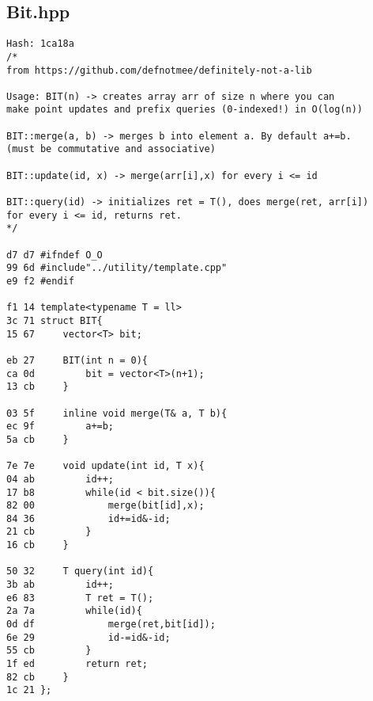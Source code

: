 \documentclass[11pt, a4paper, twoside]{article}
\begin{document}
\subsection{Bit.hpp}
\begin{lstlisting}
Hash: 1ca18a
/*
from https://github.com/defnotmee/definitely-not-a-lib

Usage: BIT(n) -> creates array arr of size n where you can
make point updates and prefix queries (0-indexed!) in O(log(n))

BIT::merge(a, b) -> merges b into element a. By default a+=b.
(must be commutative and associative)

BIT::update(id, x) -> merge(arr[i],x) for every i <= id

BIT::query(id) -> initializes ret = T(), does merge(ret, arr[i])
for every i <= id, returns ret.
*/

d7 d7 #ifndef O_O
99 6d #include"../utility/template.cpp"
e9 f2 #endif

f1 14 template<typename T = ll>
3c 71 struct BIT{
15 67     vector<T> bit;
      
eb 27     BIT(int n = 0){
ca 0d         bit = vector<T>(n+1);
13 cb     }
          
03 5f     inline void merge(T& a, T b){
ec 9f         a+=b;
5a cb     }
      
7e 7e     void update(int id, T x){
04 ab         id++;
17 b8         while(id < bit.size()){
82 00             merge(bit[id],x);
84 36             id+=id&-id;
21 cb         }
16 cb     }
      
50 32     T query(int id){
3b ab         id++;
e6 83         T ret = T();
2a 7a         while(id){
0d df             merge(ret,bit[id]);
6e 29             id-=id&-id;
55 cb         }
1f ed         return ret;
82 cb     }
1c 21 };
\end{lstlisting}
\end{document}
